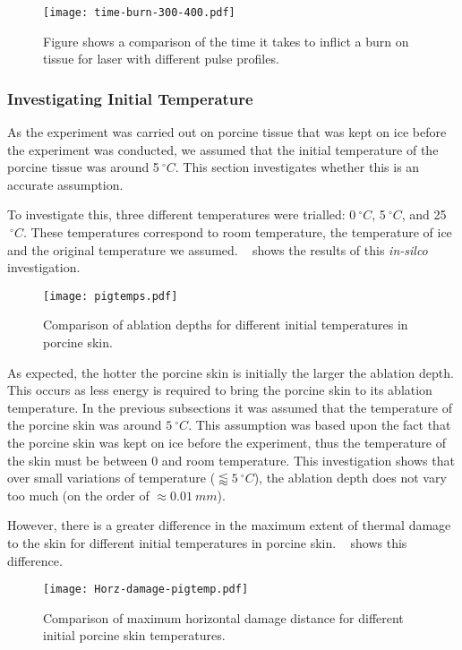 \begin{figure}[!htbp]
	\centering
	\texttt{[image: time-burn-300-400.pdf]}
	\caption{Figure shows a comparison of the time it takes to inflict a burn on tissue for laser with different pulse profiles.}
	\label{fig:pulsetypeburn}
\end{figure}
\FloatBarrier
\subsubsection*{Investigating Initial Temperature}

As the experiment was carried out on porcine tissue that was kept on ice before the experiment was conducted, we assumed that the initial temperature of the porcine tissue was around 5$~^{\circ}C$.
This section investigates whether this is an accurate assumption.

To investigate this, three different temperatures were trialled: 0$~^{\circ}C$, 5$~^{\circ}C$, and 25$~^{\circ}C$.
These temperatures correspond to room temperature, the temperature of ice and the original temperature we assumed.
~ shows the results of this \textit{in-silco} investigation.


\begin{figure}[!htbp]
	\centering
	\texttt{[image: pigtemps.pdf]}
	\caption{Comparison of ablation depths for different initial temperatures in porcine skin.}
	\label{fig:pigtempcomp}
\end{figure}

As expected, the hotter the porcine skin is initially the larger the ablation depth.
This occurs as less energy is required to bring the porcine skin to its ablation temperature.
In the previous subsections it was assumed that the temperature of the porcine skin was around $5~^{\circ}C$.
This assumption was based upon the fact that the porcine skin was kept on ice before the experiment, thus the temperature of the skin must be between 0 and room temperature.
This investigation shows that over small variations of temperature ($\lessapprox 5~^{\circ}C$), the ablation depth does not vary too much (on the order of $\approx 0.01~mm$).

However, there is a greater difference in the maximum extent of thermal damage to the skin for different initial temperatures in porcine skin.
~ shows this difference.


\begin{figure}[!htbp]
	\centering
	\texttt{[image: Horz-damage-pigtemp.pdf]}
	\caption{Comparison of maximum horizontal damage distance for different initial porcine skin temperatures.}
	\label{fig:horzdamagepig}
\end{figure}

